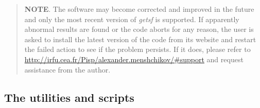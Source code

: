 \documentclass[a4paper,10pt]{article}
\begin{document}
\begin{quote} %
\textbf{NOTE}. The software may become corrected and improved in the future and only the most recent version of \textsl{getsf} is
supported. If apparently abnormal results are found or the code aborts for any reason, the user is asked to install the latest
version of the code from its website and restart the failed action to see if the problem persists. If it does, please refer to
\url{http://irfu.cea.fr/Pisp/alexander.menshchikov/#support} and request assistance from the author.
\end{quote} %


\subsection{The utilities and scripts}
\label{utils}
\end{document}
